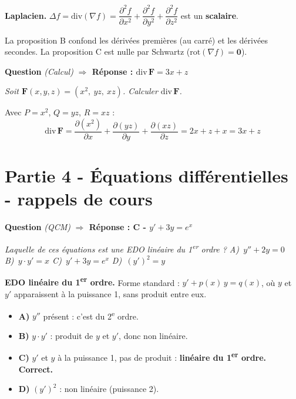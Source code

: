 \documentclass[11pt,a4paper]{article}
\newcounter{qnum}
\newcommand{\qtitre}[2]{%
  \stepcounter{qnum}%
  \medskip\noindent
  \textbf{\color{bleutexte}Question \theqnum}\enspace
  \textit{(#1)}\enspace
  \textcolor{vertok}{\textbf{$\Rightarrow$ Réponse : #2}}
  \par\smallskip
}
\newcommand{\qenonce}[1]{%
  \begin{mdframed}[backgroundcolor=grisbox, linewidth=0pt,
    innerleftmargin=8pt, innerrightmargin=8pt,
    innertopmargin=5pt, innerbottommargin=5pt,
    skipabove=2pt, skipbelow=4pt]
  \small\textit{#1}
  \end{mdframed}
}
\begin{document}
\begin{methodebox}
\textbf{Laplacien.} $\Delta f = \text{div}(\nabla f) = \dfrac{\partial^2 f}{\partial x^2}+\dfrac{\partial^2 f}{\partial y^2}+\dfrac{\partial^2 f}{\partial z^2}$ est un \textbf{scalaire}.

La proposition B confond les dérivées premières (au carré) et les dérivées secondes. La proposition C est nulle par Schwartz ($\text{rot}(\nabla f) = \mathbf{0}$).
\end{methodebox}

\qtitre{Calcul}{$\text{div}\,\mathbf{F} = 3x + z$}
\qenonce{Soit $\mathbf{F}(x,y,z) = (x^2,\ yz,\ xz)$. Calculer $\text{div}\,\mathbf{F}$.}

\begin{reponsebox}
Avec $P = x^2$, $Q = yz$, $R = xz$ :
$$\text{div}\,\mathbf{F} = \frac{\partial(x^2)}{\partial x} + \frac{\partial(yz)}{\partial y} + \frac{\partial(xz)}{\partial z} = 2x + z + x = \boxed{3x + z}$$
\end{reponsebox}

\section{Partie 4 - Équations différentielles - rappels de cours}

\qtitre{QCM}{C - $y' + 3y = e^x$}
\qenonce{Laquelle de ces équations est une EDO linéaire du 1\textsuperscript{er} ordre ?
\quad A)~$y'' + 2y = 0$
\quad B)~$y \cdot y' = x$
\quad C)~$y' + 3y = e^x$
\quad D)~$(y')^2 = y$}

\begin{methodebox}
\textbf{EDO linéaire du 1\textsuperscript{er} ordre.} Forme standard : $y' + p(x)\,y = q(x)$, où $y$ et $y'$ apparaissent à la puissance 1, sans produit entre eux.
\end{methodebox}

\begin{itemize}[leftmargin=1.5em, itemsep=2pt]
  \item \textcolor{rougeerr}{\textbf{A)}} $y''$ présent : c'est du 2\textsuperscript{e} ordre.
  \item \textcolor{rougeerr}{\textbf{B)}} $y\cdot y'$ : produit de $y$ et $y'$, donc non linéaire.
  \item \textcolor{vertok}{\textbf{C)}} $y'$ et $y$ à la puissance 1, pas de produit : \textbf{linéaire du 1\textsuperscript{er} ordre.} \textbf{Correct.}
  \item \textcolor{rougeerr}{\textbf{D)}} $(y')^2$ : non linéaire (puissance 2).
\end{itemize}
\end{document}
